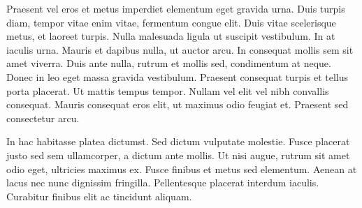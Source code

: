  Praesent vel eros et metus imperdiet elementum eget gravida urna. Duis turpis diam, tempor vitae enim vitae, fermentum congue elit. Duis vitae scelerisque metus, et laoreet turpis. Nulla malesuada ligula ut suscipit vestibulum. In at iaculis urna. Mauris et dapibus nulla, ut auctor arcu. In consequat mollis sem sit amet viverra. Duis ante nulla, rutrum et mollis sed, condimentum at neque. Donec in leo eget massa gravida vestibulum. Praesent consequat turpis et tellus porta placerat. Ut mattis tempus tempor. Nullam vel elit vel nibh convallis consequat. Mauris consequat eros elit, ut maximus odio feugiat et. Praesent sed consectetur arcu.

In hac habitasse platea dictumst. Sed dictum vulputate molestie. Fusce placerat justo sed sem ullamcorper, a dictum ante mollis. Ut nisi augue, rutrum sit amet odio eget, ultricies maximus ex. Fusce finibus et metus sed elementum. Aenean at lacus nec nunc dignissim fringilla. Pellentesque placerat interdum iaculis. Curabitur finibus elit ac tincidunt aliquam. 